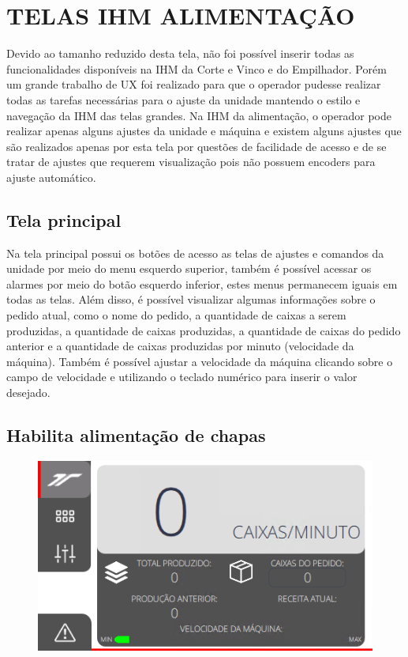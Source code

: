 \thispagestyle{fancy}
\vspace*{40 pt}

\section{\large{\MakeUppercase{Telas IHM alimentação}}}
Devido ao tamanho reduzido desta tela, não foi possível inserir todas as funcionalidades disponíveis na IHM da Corte e Vinco e do Empilhador.
 Porém um grande trabalho de UX foi realizado para que o operador pudesse realizar todas as tarefas necessárias para o ajuste da unidade mantendo
 o estilo e navegação da IHM das telas grandes. Na IHM da alimentação, o operador pode realizar apenas alguns ajustes da unidade e máquina e existem
 alguns ajustes que são realizados apenas por esta tela por questões de facilidade de acesso e de se tratar de ajustes que requerem visualização pois
 não possuem encoders para ajuste automático.
 
\subsection{\small{Tela principal}}\label{ihmAlimentacaoTelaPrincipal}

Na tela principal possui os botões de acesso as telas de ajustes e comandos da unidade por meio do menu esquerdo superior, também é possível acessar
os alarmes por meio do botão esquerdo inferior, estes menus permanecem iguais em todas as telas. Além disso, é possível visualizar algumas informações 
sobre o pedido atual, como o nome do pedido, a quantidade de caixas a serem produzidas, a quantidade de caixas produzidas, a quantidade de caixas
do pedido anterior e a quantidade de caixas produzidas por minuto (velocidade da máquina). Também é possível ajustar a velocidade da máquina clicando
sobre o campo de velocidade e utilizando o teclado numérico para inserir o valor desejado.


\subsection{\small Habilita alimentação de chapas}
\vspace*{\fill}
\begin{figure}[h]
    \centering
    \includegraphics{src/imagesFlexo/11-IHMALM/e-1.png}
\end{figure}
\vspace*{\fill}

